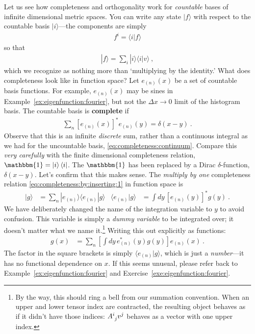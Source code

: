 \documentclass[12pt, oneside]{report}    %
\begin{document}
Let us see how completeness and orthogonality work for \emph{countable} bases of infinite dimensional metric spaces.  You can write any state $|f\rangle$ with respect to the countable basis $|i\rangle$---the components are simply
\begin{align}
  f^i = \langle i | f \rangle
\end{align}
so that 
\begin{align}
  |f\rangle = \sum_i |i\rangle \langle i | v \rangle \ ,
  \label{eq:completeness:by:inserting:1}
\end{align}
which we recognize as nothing more than `multiplying by the identity.' 
%
What does completeness look like in function space?
Let $e_{(n)}(x)$ be a set of countable basis functions. For example, $e_{(n)}(x)$ may be sines in Example~\ref{ex:eigenfunction:fourier}, but not the $\Delta x\to 0$ limit of the histogram basis.  The countable basis is \textbf{complete} if
\begin{align}
  \sum_n \left[e_{(n)}(x)\right]^* e_{(n)}(y) = \delta(x-y) \ .
  \label{eq:function:space:completeness}
\end{align}
Observe that this is an infinite \emph{discrete} sum, rather than a continuous integral as we had for the uncountable basis, \eqref{eq:completeness:continuum}.
Compare this \emph{very carefully} with the finite dimensional completeness relation, $\mathbbm{1} = \ket{i}\bra{i}$. The $\mathbbm{1}$ has been replaced by a Dirac $\delta$-function, $\delta(x-y)$. Let's confirm that this makes sense. The \emph{multiply by one} completeness relation \eqref{eq:completeness:by:inserting:1} in function space is
\begin{align}
  |g\rangle 
  &= 
  \sum_n |e_{(n)}\rangle\langle e_{(n)}| g\rangle
  &
  \langle e_{(n)}| g\rangle &=
  \int dy \, [e_{(n)}(y)]^* g(y) \ .
\end{align}
We have deliberately changed the name of the integration variable to $y$ to avoid confusion. This variable is simply a \emph{dummy variable} to be integrated over;  it doesn't matter what we name it.\footnote{By the way, this should ring a bell from our summation convention. When an upper and lower tensor index are contracted, the resulting object behaves as if it didn't have those indices: $\mat{A}{i}{j}v^j$ behaves as a vector with one upper index.} Writing this out explicitly as functions:
\begin{align}
  g(x) &= \sum_n\left[\int dy\, e_{(n)}^*(y)g(y)\right] e_{(n)}(x) \ .
  \label{eq:complenesss:function:space:in:action }
\end{align}
The factor in the square brackets is simply $\langle e_{(n)}| g\rangle$, which is just a \emph{number}---it has no functional dependence on $x$.
If this seems unusual, please refer back to Example~\ref{ex:eigenfunction:fourier} and Exercise~\ref{exe:eigenfunction:fourier}. 
\end{document}
